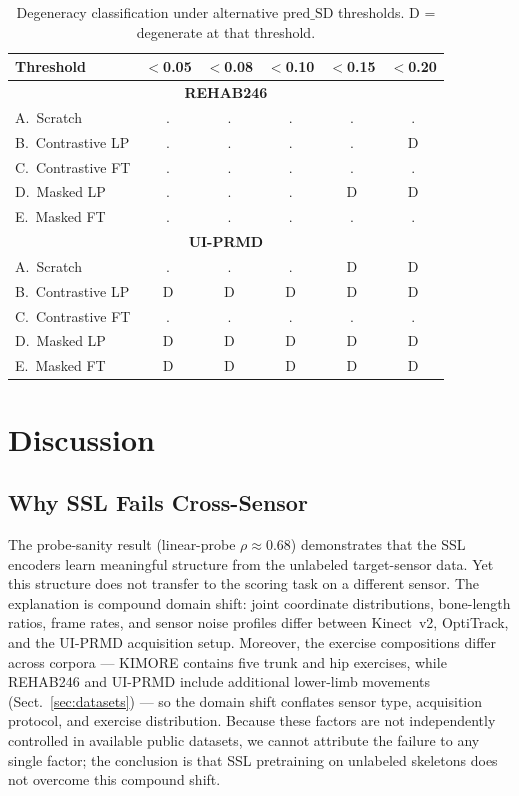 \documentclass[10pt,journal]{IEEEtran}
\begin{document}
\begin{table}[t]
\centering
\caption{Degeneracy classification under alternative $\text{pred\_SD}$ thresholds. D = degenerate at that threshold.}
\label{tab:deg-sensitivity}
\small
\begin{tabular}{@{}lccccc@{}}
\toprule
Threshold & $<$0.05 & $<$0.08 & $<$0.10 & $<$0.15 & $<$0.20 \\
\midrule
\multicolumn{6}{c}{\textbf{REHAB246}} \\
A.\ Scratch         & . & . & . & . & . \\
B.\ Contrastive LP  & . & . & . & . & D \\
C.\ Contrastive FT  & . & . & . & . & . \\
D.\ Masked LP       & . & . & . & D & D \\
E.\ Masked FT       & . & . & . & . & . \\
\midrule
\multicolumn{6}{c}{\textbf{UI-PRMD}} \\
A.\ Scratch         & . & . & . & D & D \\
B.\ Contrastive LP  & D & D & D & D & D \\
C.\ Contrastive FT  & . & . & . & . & . \\
D.\ Masked LP       & D & D & D & D & D \\
E.\ Masked FT       & D & D & D & D & D \\
\bottomrule
\end{tabular}
\end{table}

\section{Discussion}
\label{sec:discussion}

\subsection{Why SSL Fails Cross-Sensor}
\label{sec:why-fails}

The probe-sanity result (linear-probe $\rho \approx 0.68$) demonstrates that the SSL encoders learn meaningful structure from the unlabeled target-sensor data. Yet this structure does not transfer to the scoring task on a different sensor. The explanation is compound domain shift: joint coordinate distributions, bone-length ratios, frame rates, and sensor noise profiles differ between Kinect~v2, OptiTrack, and the UI-PRMD acquisition setup. Moreover, the exercise compositions differ across corpora --- KIMORE contains five trunk and hip exercises, while REHAB246 and UI-PRMD include additional lower-limb movements (Sect.~\ref{sec:datasets}) --- so the domain shift conflates sensor type, acquisition protocol, and exercise distribution. Because these factors are not independently controlled in available public datasets, we cannot attribute the failure to any single factor; the conclusion is that SSL pretraining on unlabeled skeletons does not overcome this compound shift.
\end{document}

